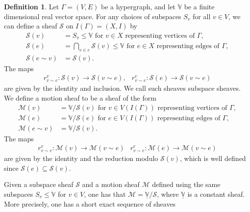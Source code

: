 \documentclass{article}
\theoremstyle{definition}
\newtheorem{definition}[theorem]{Definition}
\theoremstyle{remark}
\begin{document}
\begin{definition}
    Let $\Gamma=(V, E)$ be a hypergraph, and let $\mathbb{V}$ be a finite dimensional real vector space. For any choices of subspaces $S_v$ for all $v\in V$, we can define a sheaf $\mathcal{S}$ on $I(\Gamma)=(X, I)$ by
    \begin{align*}
        \mathcal{S}(v) &= S_v \leq \mathbb{V} \text{ for } v \in X \text{ representing vertices of $\Gamma$},\\
        \mathcal{S}(e) &= \bigcap_{v\in e} \mathcal{S}(v) \leq \mathbb{V} \text{ for } e\in X \text{ representing edges of $\Gamma$},\\
        \mathcal{S}(e \sim v) &= \mathcal{S}(v).
    \end{align*}
    The maps 
    \begin{equation*}
        \begin{array}{cc}
            r^{v}_{v\sim e}:  \mathcal{S}(v) \rightarrow \mathcal{S}(v \sim e), & 
            r^{e}_{v\sim e}:\mathcal{S}(e) \rightarrow \mathcal{S}(v \sim e) 
        \end{array}
    \end{equation*}
    are given by the identity and inclusion. We call such sheaves subspace sheaves. We define a motion sheaf to be a sheaf of the form 
        \begin{align*}
        \mathcal{M}(v) &= \mathbb{V}/\mathcal{S}(v)  \text{ for } v \in V(I(\Gamma)) \text{ representing vertices of $\Gamma$},\\
        \mathcal{M}(e) &= \mathbb{V}/\mathcal{S}(e) \text{ for } e\in V(I(\Gamma)) \text{ representing edges of $\Gamma$},\\
        \mathcal{M}(e \sim v) &=  \mathbb{V}/\mathcal{S}(v).
    \end{align*}
    The maps 
    \begin{equation*}
        \begin{array}{cc}
            r^{v}_{v\sim e}: \mathcal{M}(v) \rightarrow \mathcal{M}(v \sim e) & 
            r^{e}_{v\sim e}: \mathcal{M}(e) \rightarrow \mathcal{M}(v \sim e) 
        \end{array}
    \end{equation*}
    are given by the identity and the reduction modulo $\mathcal{S}(v)$, which is well defined since $\mathcal{S}(e) \subseteq \mathcal{S}(v)$.
\end{definition}
Given a subspace sheaf $\mathcal{S}$ and a motion sheaf $\mathcal{M}$ defined using the same subspaces $S_{v}\leq \mathbb{V}$ for $v\in V$, one has that $\mathcal{M} = \underline{\mathbb{V}}/\mathcal{S}$, where $\underline{\mathbb{V}}$ is a constant sheaf. More precisely, one has a short exact sequence of sheaves
\end{document}
